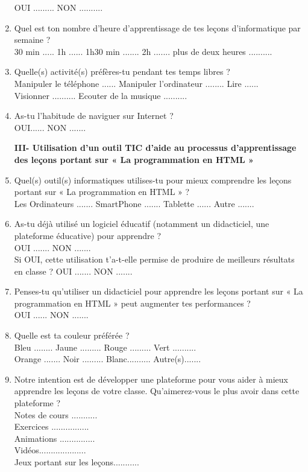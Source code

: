 \begin{enumerate}
OUI ......... NON ..........
\item Quel est ton nombre d'heure d’apprentissage de tes leçons d'informatique par semaine ?\\
30 min ..... 1h ...... 1h30 min ....... 2h ....... plus de deux heures ..........
\item Quelle(s) activité(s) préfères-tu pendant tes temps libres ?\\
Manipuler le téléphone ......	Manipuler l'ordinateur ........ Lire ......\\
Visionner .......... Ecouter de la musique ..........
\item As-tu l'habitude de naviguer sur Internet ?\\
OUI......  NON .......

\textbf{III-	Utilisation d'un outil TIC d'aide au processus d'apprentissage des leçons portant sur « La programmation en HTML »}\\

\item Quel(s) outil(s) informatiques utilises-tu pour mieux comprendre les leçons portant sur « La programmation en HTML » ?\\	
Les Ordinateurs ....... SmartPhone ....... Tablette ...... Autre .......
\item As-tu déjà utilisé un logiciel éducatif (notamment un didacticiel, une plateforme éducative) pour apprendre ?\\
OUI ....... NON .......\\
Si OUI, cette utilisation t’a-t-elle permise de produire de meilleurs résultats en classe ?	
OUI ....... NON .......
\item Penses-tu qu'utiliser un didacticiel pour apprendre les  leçons portant sur « La programmation en HTML » peut augmenter tes performances ?\\
OUI ...... NON .......
\item Quelle est ta couleur préférée ?\\
Bleu ........ Jaune ......... Rouge .........  Vert ..........\\
Orange ....... Noir ......... Blanc..........  Autre(s).......
\item Notre intention est de développer une plateforme pour vous aider à mieux apprendre les leçons de votre classe. Qu'aimerez-vous le plus avoir dans cette plateforme ?\\
Notes de cours ...........\\
Exercices ................\\
Animations ...............\\
Vidéos....................\\
Jeux portant sur les leçons...........


\end{enumerate}
